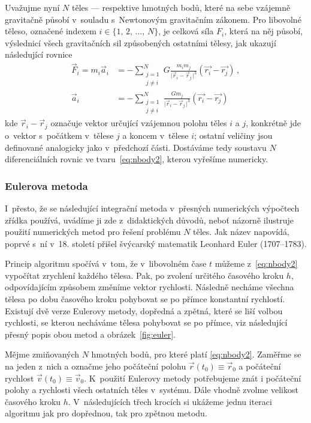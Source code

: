 \documentclass[A4paper, 12pt, oneside]{book}
\newcommand{\abs}[1]{\lvert #1 \,\rvert}
\begin{document}
Uvažujme nyní $N$ těles --- respektive hmotných bodů, které na sebe vzájemně gravitačně působí v~souladu s~Newtonovým gravitačním zákonem. Pro libovolné těleso, označené indexem $i\in\{1,\,2,\,\dots,\,N\}$, je celková síla $F_i$, která na něj působí, výslednicí všech gravitačních sil způsobených ostatními tělesy, jak ukazují následující rovnice
\begin{align} 
	\vec{F}_i = m_i\vec{a}_i &= -\sum_{\substack{j=1 \\ j\neq i}}^N G\frac{m_im_j}{\abs{\vec{r}_i-\vec{r}_j}^3}(\vec{r_i}-\vec{r_j}) \label{eq:nbody1}\,, \\
		\vec{a}_i &= -\sum_{\substack{j=1 \\ j\neq i}}^N \frac{Gm_j}{\abs{\vec{r}_i-\vec{r}_j}^3}(\vec{r_i}-\vec{r_j}) \label{eq:nbody2}
\end{align}
kde $\vec{r}_i-\vec{r}_j$ označuje vektor určující vzájemnou polohu těles $i$ a $j$, konkrétně jde o~vektor s~počátkem v~tělese $j$ a koncem v~tělese $i$; ostatní veličiny jsou definované analogicky jako v~předchozí části. Dostáváme tedy soustavu $N$ diferenciálních rovnic ve tvaru~\eqref{eq:nbody2}, kterou vyřešíme numericky.
\subsubsection{Eulerova metoda}
I~přesto, že se následující integrační metoda v~přesných numerických výpočtech zřídka používá, uvádíme ji zde z~didaktických důvodů, neboť názorně ilustruje použití numerických metod pro řešení problému $N$ těles. Jak název napovídá, poprvé s~ní v~18. století přišel švýcarský matematik Leonhard Euler (1707--1783).

Princip algoritmu spočívá v~tom, že v~libovolném čase $t$ můžeme z~\eqref{eq:nbody2} vypočítat zrychlení každého tělesa. Pak, po zvolení určitého časového kroku $h$, odpovídajícím způsobem změníme vektor rychlosti. Následně necháme všechna tělesa po dobu časového kroku pohybovat se po přímce konstantní rychlostí. Existují dvě verze Eulerovy metody, dopředná a zpětná, které se liší volbou rychlosti, se kterou necháváme tělesa pohybovat se po přímce, viz následující přesný popis obou metod a obrázek~\ref{fig:euler}.

Mějme zmiňovaných $N$ hmotných bodů, pro které platí \eqref{eq:nbody2}. Zaměřme se na jeden z~nich a označme jeho počáteční polohu $\vec{r}(t_0)\equiv\vec{r}_0$ a počáteční rychlost $\vec{v}(t_0)\equiv\vec{v}_0$. K~použití Eulerovy metody potřebujeme znát i počáteční polohy a rychlosti všech ostatních těles v~systému. Dále vhodně zvolme velikost časového kroku $h$. V~následujících třech krocích si ukážeme jednu iteraci algoritmu jak pro dopřednou, tak pro zpětnou metodu.
\end{document}
